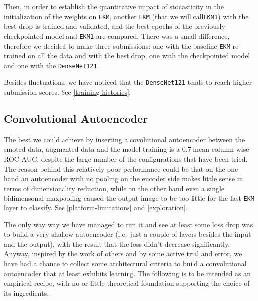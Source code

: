 \documentclass[aps,twocolumn,secnumarabic,nobalancelastpage,amsmath,amssymb,
nofootinbib]{revtex4}
\begin{document}
Then, in order to establish the quantitative impact of stocasticity in
the initialization of the weights on \texttt{EKM}, another \texttt{EKM} (that we will call\texttt{EKM1}) with the best drop is trained and validated, and the best epochs of the previously checkpointed model and \texttt{EKM1} are compared. There was a small difference, therefore we decided to make three submissions: one with the baseline \texttt{EKM} re-trained on all the data and with the best drop, one with the checkpointed model and one with the \texttt{DenseNet121}.

Besides fluctuations, we have noticed that the \texttt{DenseNet121}
tends to reach higher submission scores. See \ref{training-histories}.

\subsection{Convolutional Autoencoder}\label{ae}

The best we could achieve by inserting a covolutional autoencoder
between the smoted data, augmented data and the model training is a
0.7 mean column-wise ROC AUC, despite the large number of the
configurations that have been tried. The reason behind this relatively
poor performance could be that on the one hand an autoencoder with no
pooling on the encoder side makes little sense in terms of
dimensionality reduction, while on the other hand even a single
bidimensonal maxpooling caused the output image to be too little for the last \texttt{EKM} layer to classify. See \ref{platform-limitations} and \ref{exploration}. 

The only way way we have managed to run it and see at least some loss
drop was to build a very shallow autoencoder (i.e.~just a couple of
layers besides the input and the output), with the result that the loss
didn't decrease significantly. Anyway, inspired by the work of others
and by some active trial and error, we have had a chance to collect some architectural criteria to build a convolutional autoencoder that at least exhibits learning. The following is to be intended as an empirical recipe, with no or little theoretical foundation supporting the choice of its ingredients. 
\end{document}
